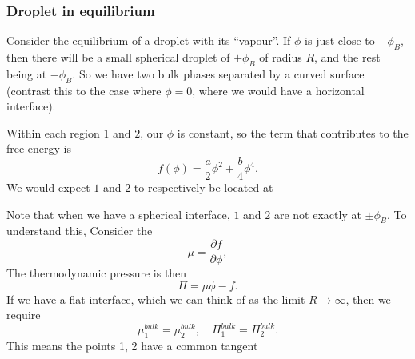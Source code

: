 \documentclass[a4paper]{article}
\begin{document}
\subsubsection*{Droplet in equilibrium}
Consider the equilibrium of a droplet with its ``vapour''. If $\phi$ is just close to $-\phi_B$, then there will be a small spherical droplet of $+\phi_B$ of radius $R$, and the rest being at $-\phi_B$. So we have two bulk phases separated by a curved surface (contrast this to the case where $\phi = 0$, where we would have a horizontal interface).
\begin{center}
\end{center}
Within each region $1$ and $2$, our $\phi$ is constant, so the term that contributes to the free energy is
\[
  f (\phi) = \frac{a}{2} \phi^2 + \frac{b}{4} \phi^4.
\]
We would expect $1$ and $2$ to respectively be located at
\begin{center}
\end{center}
Note that when we have a spherical interface, $1$ and $2$ are not exactly at $\pm \phi_B$. To understand this, Consider the 
\[
  \mu = \frac{\partial f}{\partial \phi},
\]
 The thermodynamic pressure is then
\[
  \Pi = \mu \phi - f.
\]
If we have a flat interface, which we can think of as the limit $R \to \infty$, then we require
\[
  \mu_1^{bulk} = \mu_2^{bulk},\quad \Pi_1^{bulk} = \Pi_2^{bulk}.
\]
This means the points 1, 2 have a common tangent
\begin{center}
\end{center}
\end{document}
